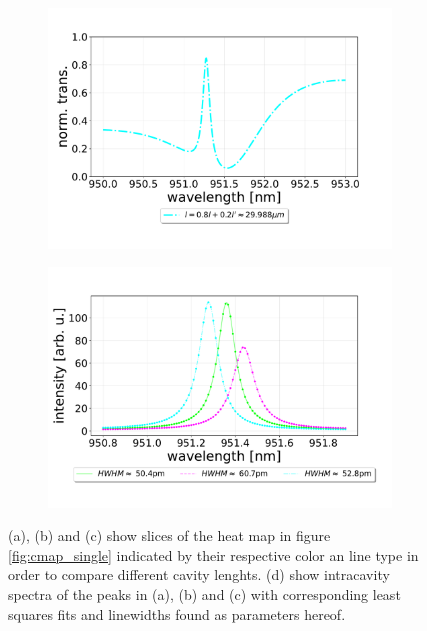 \begin{figure}[h!]
\begin{subfigure}[b]{0.49\textwidth}
        \includegraphics[width=\textwidth]{figures/cmap_slice3.pdf}
        \caption{}
        \label{fig:cmap_slice3}
    \end{subfigure}
    \begin{subfigure}[b]{0.49\textwidth}
        \centering
        \includegraphics[width=\textwidth]{figures/cmap_lws.pdf}
        \caption{}
        \label{fig:cmap_lws}
    \end{subfigure}
    \caption{(a), (b) and (c) show slices of the heat map in figure \ref{fig:cmap_single} indicated by their respective color an line type in order to compare different cavity lenghts. (d) show intracavity spectra of the peaks in (a), (b) and (c) with corresponding least squares fits and linewidths found as parameters hereof. }
    \label{fig:cmap_slices}
\end{figure}

